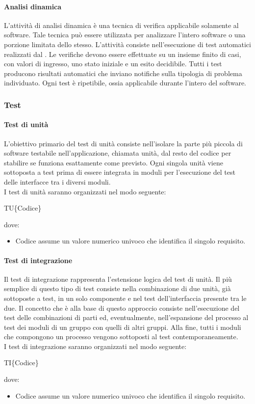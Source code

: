 \paragraph{Analisi dinamica}
L'attività di analisi dinamica è una tecnica di verifica applicabile solamente al software. Tale tecnica può essere utilizzata per analizzare l'intero software o una
porzione limitata dello stesso. L'attività consiste nell'esecuzione di test automatici realizzati
dal . Le verifiche devono essere effettuate su un insieme finito di casi, con valori di
ingresso, uno stato iniziale e un esito decidibile. Tutti i test producono risultati automatici
che inviano notifiche sulla tipologia di problema individuato. Ogni test è ripetibile, ossia applicabile durante l'intero  del software.

\subsubsection{Test}
\paragraph{Test di unità}
L'obiettivo primario del test di unità consiste nell'isolare la parte più piccola di software testabile
nell'applicazione, chiamata unità, dal resto del codice per stabilire se funziona esattamente come previsto. Ogni singola unità viene sottoposta a test prima di essere integrata in moduli per
l'esecuzione del test delle interfacce tra i diversi moduli.\\
I test di unità saranno organizzati nel modo seguente: \\
\begin{center}TU\{Codice\}\end{center}
dove:
\begin{itemize}
	\item Codice assume un valore numerico univoco che identifica il singolo requisito.
\end{itemize}
\paragraph{Test di integrazione}
Il test di integrazione rappresenta l'estensione logica del test di unità. Il più semplice di questo
tipo di test consiste nella combinazione di due unità, già sottoposte a test, in un solo componente
e nel test dell'interfaccia presente tra le due. Il concetto che è alla base di questo approccio
consiste nell'esecuzione del test delle combinazioni di parti ed, eventualmente, nell'espansione
del processo al test dei moduli di un gruppo con quelli di altri gruppi. Alla fine, tutti i moduli
che compongono un processo vengono sottoposti al test contemporaneamente.\\
I test di integrazione saranno organizzati nel modo seguente: \\
\begin{center}TI\{Codice\}\end{center}
dove:
\begin{itemize}
	\item Codice assume un valore numerico univoco che identifica il singolo requisito.
\end{itemize}
